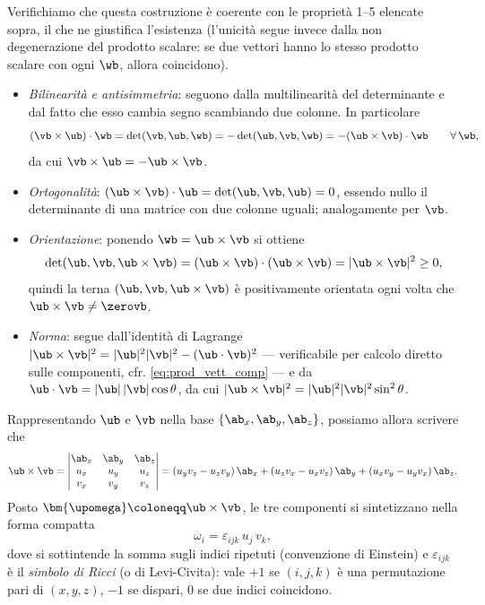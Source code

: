 	Verifichiamo che questa costruzione è coerente con le proprietà 1--5 elencate sopra,
	il che ne giustifica l'esistenza (l'unicità segue invece dalla non degenerazione del
	prodotto scalare: se due vettori hanno lo stesso prodotto scalare con ogni $\wb$,
	allora coincidono).
	\begin{itemize}
		\item \emph{Bilinearità e antisimmetria}: seguono dalla multilinearità del determinante
		e dal fatto che esso cambia segno scambiando due colonne. In particolare
		\begin{equation}
			(\vb\times\ub)\cdot\wb=\det(\vb,\ub,\wb)=-\det(\ub,\vb,\wb)=-(\ub\times\vb)\cdot\wb
			\qquad\forall\,\wb,
		\end{equation}
		da cui $\vb\times\ub=-\ub\times\vb$.
		\item \emph{Ortogonalità}: $(\ub\times\vb)\cdot\ub=\det(\ub,\vb,\ub)=0$, essendo nullo
		il determinante di una matrice con due colonne uguali; analogamente per $\vb$.
		\item \emph{Orientazione}: ponendo $\wb=\ub\times\vb$ si ottiene
		\begin{equation}
			\det(\ub,\vb,\ub\times\vb)=(\ub\times\vb)\cdot(\ub\times\vb)=|\ub\times\vb|^2\ge0,
		\end{equation}
		quindi la terna $(\ub,\vb,\ub\times\vb)$ è positivamente orientata ogni volta che
		$\ub\times\vb\neq\zerovb$.
		\item \emph{Norma}: segue dall'identità di Lagrange
		$|\ub\times\vb|^2=|\ub|^2|\vb|^2-(\ub\cdot\vb)^2$ --- verificabile per calcolo diretto
		sulle componenti, cfr. \eqref{eq:prod_vett_comp} --- e da $\ub\cdot\vb=|\ub|\,|\vb|\cos\theta$,
		da cui $|\ub\times\vb|^2=|\ub|^2|\vb|^2\sin^2\theta$.
	\end{itemize}


Rappresentando $\ub$ e $\vb$ nella base $\{\ab_x, \ab_y,\ab_z\}$, possiamo allora scrivere che 
\begin{equation}\label{eq:prod_vett_comp}
	\ub \times \vb =
	\begin{vmatrix}
		\ab_x & \ab_y & \ab_z \\
		u_x & u_y & u_z \\
		v_x & v_y & v_z
	\end{vmatrix}
	= (u_y v_z - u_z v_y)\,\ab_x
	+ (u_z v_x - u_x v_z)\,\ab_y
	+ (u_x v_y - u_y v_x)\,\ab_z.
\end{equation}
Posto $\bm{\upomega}\coloneqq \ub \times \vb$, le tre componenti si sintetizzano	nella forma compatta
\begin{equation}\label{eq:prod_vett_ricci}
	\omega_i = \varepsilon_{ijk}\,u_j\,v_k,
\end{equation}
dove si sottintende la somma sugli indici ripetuti (convenzione di
Einstein) e $\varepsilon_{ijk}$ è il \textit{simbolo di Ricci}
(o di Levi-Civita): vale $+1$ se $(i,j,k)$ è una permutazione pari
di $(x,y,z)$, $-1$ se dispari, $0$ se due indici coincidono.

